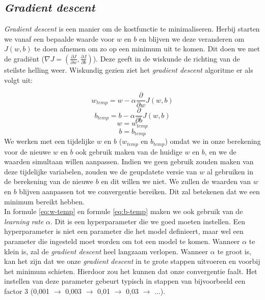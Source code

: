 \subsection{\textit{Gradient descent}}

\textit{Gradient descent} is een manier om de kostfunctie te minimaliseren. Herbij starten we vanaf een bepaalde waarde voor $w$ en $b$ en blijven we deze veranderen om $J(w, b)$ te doen afnemen om zo op een minimum uit te komen. Dit doen we met de gradiënt ($\nabla J = (\frac{\partial J}{\partial w}, \frac{\partial J}{\partial b})$). Deze geeft in de wiskunde de richting van de steilste helling weer. Wiskundig gezien ziet het \textit{gradient descent} algoritme er als volgt uit:

\begin{equation}
	w_{temp} = w - \alpha \frac{\partial}{\partial w} J(w, b)
	\label{eq:w-temp}
\end{equation}
\begin{equation}
	b_{temp} = b - \alpha \frac{\partial}{\partial b} J(w, b)
	\label{eq:b-temp}
\end{equation}
\begin{equation}
	w = w_{temp} 
\end{equation}
\begin{equation}
	b = b_{temp}
\end{equation}
\newpage
\noindent
We werken met een tijdelijke $w$ en $b$ ($w_{temp}$ en $b_{temp}$) omdat we in onze berekening voor de nieuwe $w$ en $b$ ook gebruik maken van de huidige $w$ en $b$, en we de waarden simultaan willen aanpassen. Indien we geen gebruik zouden maken van deze tijdelijke variabelen, zouden we de geupdatete versie van $w$ al gebruiken in de berekening van de nieuwe $b$ en dit willen we niet. We zullen de waarden van $w$ en $b$ blijven aanpassen tot we convergentie bereiken. Dit zal betekenen dat we een minimum bereikt hebben. \\
\newline
In formule \ref{eq:w-temp} en formule \ref{eq:b-temp} maken we ook gebruik van de \textit{learning rate} $\alpha$. Dit is een hyperparameter die we goed moeten instellen. Een hyperparameter is niet een parameter die het model definieert, maar wel een parameter die ingesteld moet worden om tot een model te komen. Wanneer $\alpha$ te klein is, zal de \textit{gradient descent} heel langzaam verlopen. Wanneer $\alpha$ te groot is, kan het zijn dat we onze \textit{gradient descent} in te grote stappen uitvoeren en voorbij het minimum schieten. Hierdoor zou het kunnen dat onze convergentie faalt. Het instellen van deze parameter gebeurt typisch in stappen van bijvoorbeeld een factor 3 (0,001 $\rightarrow$ 0,003 $\rightarrow$ 0,01 $\rightarrow$ 0,03 $\rightarrow$ ...). \\
